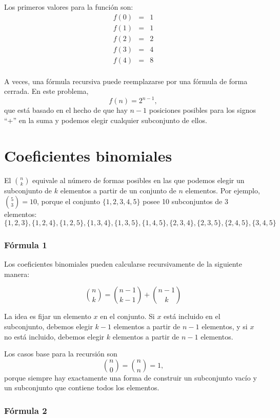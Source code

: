 Los primeros valores para la función son:
\[
    \begin{array}{lcl}
        f(0) & = & 1 \\
        f(1) & = & 1 \\
        f(2) & = & 2 \\
        f(3) & = & 4 \\
        f(4) & = & 8 \\
    \end{array}
\]

A veces, una fórmula recursiva puede reemplazarse por una fórmula de forma
cerrada. En este problema,
\[
    f(n)=2^{n-1},
\]
que está basado en el hecho de que hay $n-1$ posiciones posibles para los
signos ``+'' en la suma y podemos elegir cualquier subconjunto de ellos.

\section{Coeficientes binomiales}


El  $\binom{n}{k}$ equivale al número de formas
posibles en las que podemos elegir un subconjunto de $k$ elementos a partir de
un conjunto de $n$ elementos. Por ejemplo, $\binom{5}{3}=10$, porque el conjunto
$\{1,2,3,4,5\}$ posee 10 subconjuntos de 3 elementos:
\[ \{1,2,3\}, \{1,2,4\}, \{1,2,5\}, \{1,3,4\}, \{1,3,5\},
    \{1,4,5\}, \{2,3,4\}, \{2,3,5\}, \{2,4,5\}, \{3,4,5\} \]

\subsubsection{Fórmula 1}

Los coeficientes binomiales pueden calcularse recursivamente de la siguiente
manera:

\[
    \binom{n}{k} = \binom{n-1}{k-1} + \binom{n-1}{k}
\]

La idea es fijar un elemento $x$ en el conjunto. Si $x$ está incluido en el
subconjunto, debemos elegir $k-1$ elementos a partir de $n-1$ elementos, y si
$x$ no está incluido, debemos elegir $k$ elementos a partir de $n-1$ elementos.

Los casos base para la recursión son
\[
    \binom{n}{0}  =  \binom{n}{n} = 1,
\]
porque siempre hay exactamente una forma de construir un subconjunto vacío
y un subconjunto que contiene todos los elementos.

\subsubsection{Fórmula 2}

